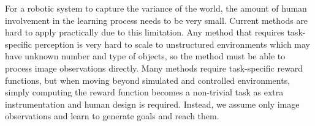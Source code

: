 For a robotic system to capture the variance of the world, the amount of human involvement in the learning process needs to be very small. 
Current methods are hard to apply practically due to this limitation. 
Any method that requires task-specific perception is very hard to scale to unstructured environments which may have unknown number and type of objects, so the method must be able to process image observations directly. 
Many methods require task-specific reward functions, but when moving beyond simulated and controlled environments, simply computing the reward function becomes a non-trivial task as extra instrumentation and human design is required. 
Instead, we assume only image observations and learn to generate goals and reach them.


